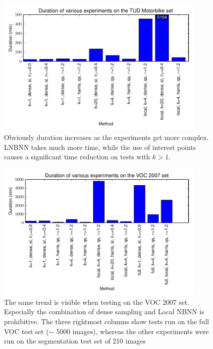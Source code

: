 \begin{figure}[hbt]
    \centering
    \includegraphics[width=0.9\textwidth]{DurTUD}
    \caption{Obviously duration increases as the experiments get more complex. LNBNN takes much more time, while the use of interest points causes a significant time reduction on tests with $k>1$.}
    \label{fig:durationTUD}
\end{figure}

\begin{figure}[hbt]
    \centering
    \includegraphics[width=0.9\textwidth]{DurVOC}
    \caption{The same trend is visible when testing on the VOC 2007 set. Especially the combination of dense sampling and Local NBNN is prohibitive. The three rightmost columns show tests run on the full VOC test set ($\sim$ 5000 images), whereas the other experiments were run on the segmentation test set of 210 images}
    \label{fig:durationVOC}
\end{figure}

